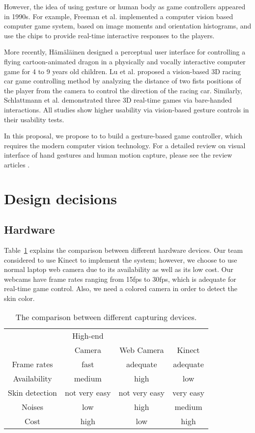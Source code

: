 \documentclass[10pt,twocolumn,letterpaper]{article}
\begin{document}
However, the idea of using gesture or human body as game
controllers appeared in 1990s. For example, 
Freeman et al. \cite{cvicg, cvfcg} implemented a computer vision based 
computer game system, based on image moments and orientation histograms, and 
use the chips to provide real-time interactive responses to the players. 

More recently, H\"{a}m\"{a}l\"{a}inen \cite{childgame} designed a perceptual user interface for
controlling a flying cartoon-animated dragon in a
physically and vocally interactive computer game for 4 to 9 years old children.
Lu et al. \cite{racecar} proposed a vision-based 3D racing car game controlling
method by analyzing the distance of two fists positions of the player
from the camera to control the direction of the racing car. Similarly, 
Schlattmann \cite{3dgames} et al. demonstrated three 3D real-time games via bare-handed 
interactions. All studies show higher usability via vision-based gesture controls 
in their usability tests.


In this proposal, we propose to to build a gesture-based game controller, which 
requires the modern computer vision technology. For a detailed review on visual 
interface of hand gestures and human motion capture, please see 
the review articles \cite{pamireview, cviureview}.

\section{Design decisions}
\subsection{Hardware}
Table~\ref{tab:hw} explains the comparison between different hardware devices.
Our team considered to use Kinect to implement the system; however, 
we choose to use normal laptop web camera due to its availability as well as its 
low cost. 
Our webcams have frame rates ranging from 15fps to 30fps, which is adequate for real-time 
game control. Also, we need a colored camera in order to detect the skin color.

\begin{table}[h]
\begin{tabular}{c|ccc}
&High-end\\
&Camera&Web Camera&Kinect \\
\hline
Frame rates & fast & adequate & adequate \\
Availability & medium & high & low \\
Skin detection & not very easy & not very easy & very easy \\
Noises & low & high & medium \\
Cost & high & low & high 
\end{tabular}
\caption{The comparison between different capturing devices.}
\label{tab:hw}
\end{table}
\end{document}
